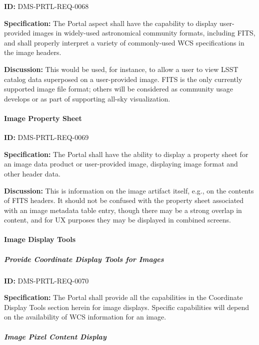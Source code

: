 \documentclass[SE,toc,lsstdraft]{lsstdoc}
\begin{document}
\label{DMS-PRTL-REQ-0068}
\textbf{ID:} DMS-PRTL-REQ-0068

\textbf{Specification:}
The Portal aspect shall have the capability to display user-provided images in widely-used astronomical community formats, including FITS, and shall properly interpret a variety of commonly-used WCS specifications in the image headers.

\textbf{Discussion:}
This would be used, for instance, to allow a user to view LSST catalog data superposed on a user-provided image.  FITS is the only currently supported image file format; others will be considered as community usage develops or as part of supporting all-sky visualization.

\paragraph{Image Property Sheet}\hfill  %

\label{DMS-PRTL-REQ-0069}
\textbf{ID:} DMS-PRTL-REQ-0069

\textbf{Specification:}
The Portal shall have the ability to display a property sheet for an image data product or user-provided image, displaying image format and other header data.

\textbf{Discussion:}
This is information on the image artifact itself, e.g., on the contents of FITS headers.  It should not be confused with the property sheet associated with an image metadata table entry, though there may be a strong overlap in content, and for UX purposes they may be displayed in combined screens.

\paragraph{Image Display Tools}\hfill  %

\subparagraph{Provide Coordinate Display Tools for Images}\hfill  %

\label{DMS-PRTL-REQ-0070}
\textbf{ID:} DMS-PRTL-REQ-0070

\textbf{Specification:}
The Portal shall provide all the capabilities in the Coordinate Display Tools section herein for image displays.  Specific capabilities will depend on the availability of WCS information for an image.

\subparagraph{Image Pixel Content Display}\hfill  %
\end{document}
